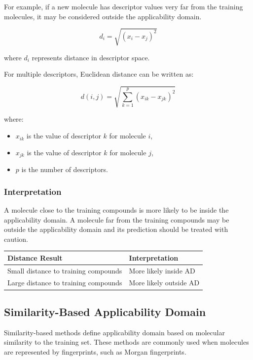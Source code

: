 \documentclass[11pt]{report}
\newenvironment{Important note}{\begin{quote}\color{red}\textbf{Important note:} }{\end{quote}}
\begin{document}
For example, if a new molecule has descriptor values very far from the training molecules, it may be considered outside the applicability domain.

\[
d_i = \sqrt{(x_i - x_j)^2}
\]

where $d_i$ represents distance in descriptor space.

For multiple descriptors, Euclidean distance can be written as:

\[
d(i,j) = \sqrt{\sum_{k=1}^{p}(x_{ik} - x_{jk})^2}
\]

where:

\begin{itemize}[leftmargin=*]
    \item $x_{ik}$ is the value of descriptor $k$ for molecule $i$,
    \item $x_{jk}$ is the value of descriptor $k$ for molecule $j$,
    \item $p$ is the number of descriptors.
\end{itemize}

\subsubsection*{Interpretation}

A molecule close to the training compounds is more likely to be inside the applicability domain. A molecule far from the training compounds may be outside the applicability domain and its prediction should be treated with caution.

\begin{center}
\begin{tabular}{ll}
\toprule
\textbf{Distance Result} & \textbf{Interpretation} \\
\midrule
Small distance to training compounds & More likely inside AD \\
Large distance to training compounds & More likely outside AD \\
\bottomrule
\end{tabular}
\end{center}

\subsection{Similarity-Based Applicability Domain}

Similarity-based methods define applicability domain based on molecular similarity to the training set. These methods are commonly used when molecules are represented by fingerprints, such as Morgan fingerprints.
\end{document}
